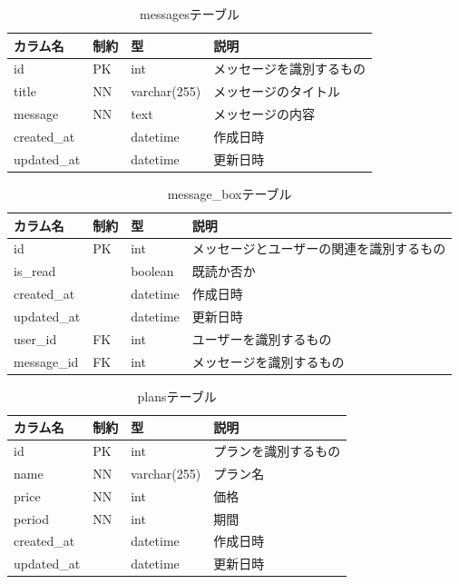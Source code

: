 \begin{table}[H]
  \centering
  \caption{messagesテーブル}
  \label{tab:db-messages}
  \begin{tabular}{|l|l|l|l|} \hline
    カラム名        & 制約 & 型            & 説明           \\ \hline \hline
    id          & PK & int          & メッセージを識別するもの \\ \hline
    title       & NN & varchar(255) & メッセージのタイトル   \\ \hline
    message     & NN & text         & メッセージの内容     \\ \hline
    created\_at &    & datetime     & 作成日時         \\ \hline
    updated\_at &    & datetime     & 更新日時         \\ \hline
  \end{tabular}
\end{table}

\begin{table}[H]
  \centering
  \caption{message\_boxテーブル}
  \label{tab:db-message-box}
  \begin{tabular}{|l|l|l|l|} \hline
    カラム名        & 制約 & 型        & 説明                   \\ \hline \hline
    id          & PK & int      & メッセージとユーザーの関連を識別するもの \\ \hline
    is\_read    &    & boolean  & 既読か否か                \\ \hline
    created\_at &    & datetime & 作成日時                 \\ \hline
    updated\_at &    & datetime & 更新日時                 \\ \hline
    user\_id    & FK & int      & ユーザーを識別するもの          \\ \hline
    message\_id & FK & int      & メッセージを識別するもの         \\ \hline
  \end{tabular}
\end{table}

\begin{table}[H]
  \centering
  \caption{plansテーブル}
  \label{tab:db-plans}
  \begin{tabular}{|l|l|l|l|} \hline
    カラム名        & 制約 & 型            & 説明         \\ \hline \hline
    id          & PK & int          & プランを識別するもの \\ \hline
    name        & NN & varchar(255) & プラン名       \\ \hline
    price       & NN & int          & 価格         \\ \hline
    period      & NN & int          & 期間         \\ \hline
    created\_at &    & datetime     & 作成日時       \\ \hline
    updated\_at &    & datetime     & 更新日時       \\ \hline
  \end{tabular}
\end{table}

